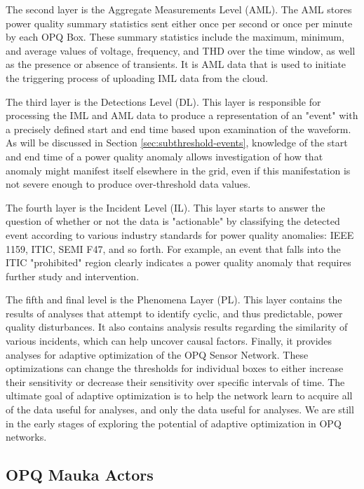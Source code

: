 The second layer is the Aggregate Measurements Level (AML). The AML stores power quality summary statistics sent either once per second or once per minute by each OPQ Box. These summary statistics include the maximum, minimum, and average values of voltage, frequency, and THD over the time window, as well as the presence or absence of transients. It is AML data that is used to initiate the triggering process of uploading IML data from the cloud.

The third layer is the Detections Level (DL). This layer is responsible for processing the IML and AML data to produce a representation of an "event" with a precisely defined start and end time based upon examination of the waveform.  As will be discussed in Section \ref{sec:subthreshold-events}, knowledge of the start and end time of a power quality anomaly allows investigation of how that anomaly might manifest itself elsewhere in the grid, even if this manifestation is not severe enough to produce over-threshold data values.

The fourth layer is the Incident Level (IL).  This layer starts to answer the question of whether or not the data is "actionable" by classifying the detected event according to various industry standards for power quality anomalies: IEEE 1159, ITIC, SEMI F47, and so forth.  For example, an event that falls into the ITIC "prohibited" region clearly indicates a power quality anomaly that requires further study and intervention.

The fifth and final level is the Phenomena Layer (PL). This layer contains the results of analyses that attempt to identify cyclic, and thus predictable, power quality disturbances. It also contains analysis results regarding the similarity of various incidents, which can help uncover causal factors.  Finally, it provides analyses for adaptive optimization of the OPQ Sensor Network. These optimizations can change the thresholds for individual boxes to either increase their sensitivity or decrease their sensitivity over specific intervals of time. The ultimate goal of adaptive optimization is to help the network learn to acquire all of the data useful for analyses, and only the data useful for analyses.  We are still in the early stages of exploring the potential of adaptive optimization in OPQ networks.

\subsection{OPQ Mauka Actors}

